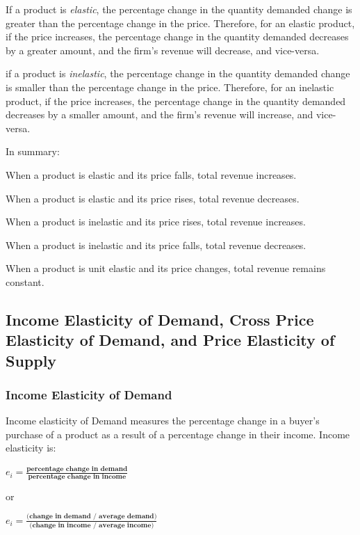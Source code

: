 \documentclass[a4paper, 12pt] {article}
\begin{document}
If a product is \emph{elastic}, the percentage change in the quantity demanded
change is greater than the percentage change in the price. Therefore, for an
elastic product, if the price increases, the percentage change in the quantity
demanded decreases by a greater amount, and the firm's revenue will decrease,
and vice-versa.

if a product is \emph{inelastic}, the percentage change in the quantity demanded
change is smaller than the percentage change in the price. Therefore, for an 
inelastic product, if the price increases, the percentage change in the quantity 
demanded decreases by a smaller amount, and the firm's revenue will increase,
and vice-versa.

In summary:
\begin{description}
    \item When a product is elastic and its price falls, total revenue
        increases.
    \item When a product is elastic and its price rises, total revenue
        decreases.
    \item When a product is inelastic and its price rises, total revenue
        increases.
    \item When a product is inelastic and its price falls, total revenue
        decreases.
    \item When a product is unit elastic and its price changes, total revenue
        remains constant.
\end{description}

\subsection{Income Elasticity of Demand, Cross Price Elasticity of Demand, and 
Price Elasticity of Supply}
\subsubsection{Income Elasticity of Demand}
Income elasticity of Demand measures the percentage change in a buyer's purchase
of a product as a result of a percentage change in their income. Income elasticity
is:
\begin{description}
    \item $e_i = \frac{\textbf{percentage change in demand}}
                      {\textbf{percentage change in income}}$ 
    \item or
    \item $e_i = \frac{\textbf{(change in demand / average demand)}}
                      {\textbf{(change in income / average income)}}$
\end{description}
\end{document}
